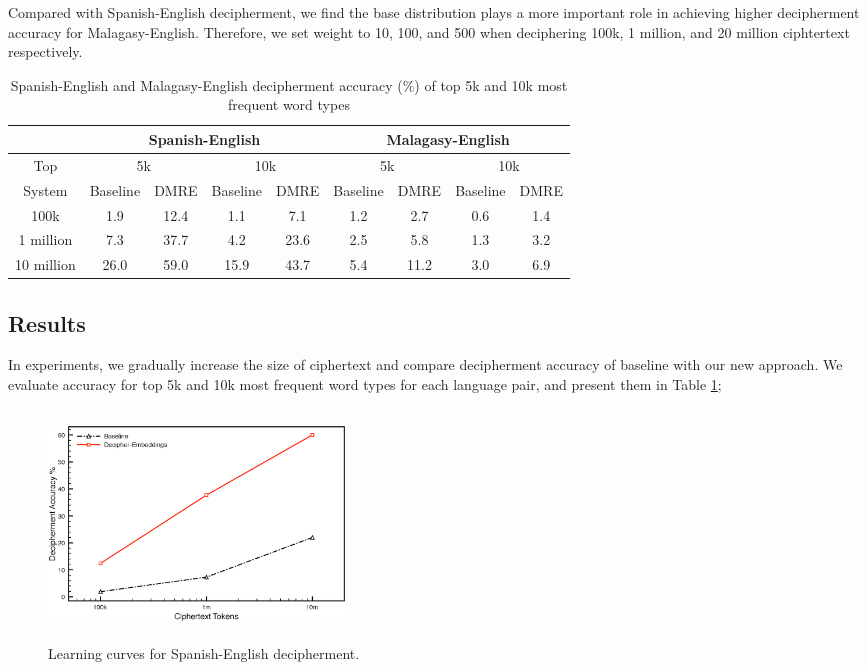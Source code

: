 Compared with Spanish-English decipherment, we find the base distribution plays a more important role in achieving higher decipherment accuracy for Malagasy-English. Therefore, we set weight to 10, 100, and 500 when deciphering 100k, 1 million, and 20 million ciphtertext respectively.


%
 \begin{table}[!ht]
 \begin{center}
 \begin{tabular}{ |c|c|c|c|c|c|c|c|c| } \hline
         & \multicolumn{4}{|c|}{Spanish-English} & \multicolumn{4}{|c|}{Malagasy-English} \\ \hline
 Top &  \multicolumn{2}{|c|}{5k} & \multicolumn{2}{|c|}{10k} & \multicolumn{2}{|c|}{5k} & \multicolumn{2}{|c|}{10k} \\ \hline
 System &  Baseline & DMRE & Baseline & DMRE &  Baseline & DMRE & Baseline & DMRE \\ \hline
 100k &  1.9 & 12.4 & 1.1 & 7.1 &  1.2 & 2.7 & 0.6 & 1.4 \\ \hline
 1 million &  7.3 & 37.7& 4.2 & 23.6 &  2.5 & 5.8 & 1.3 & 3.2 \\ \hline
 10 million &  26.0 & 59.0 & 15.9 & 43.7 &  5.4 & 11.2 & 3.0 & 6.9 \\ \hline
 \end{tabular}
 \caption{Spanish-English and Malagasy-English decipherment accuracy (\%) of top 5k and 10k most frequent word types}
 \label{decipher-acc-result}
 \end{center}
 \end{table}
%

\subsection{Results}
In experiments, we gradually increase the size of ciphertext and compare decipherment accuracy of baseline with our new approach. We evaluate accuracy for top 5k and 10k most frequent word types for each language pair, and present them in Table \ref{decipher-acc-result}; 


 \begin{figure}[!ht]
  \centering
  \includegraphics[width=3.1in,height=2.4in]{es_en_curve}
  \caption{Learning curves for Spanish-English decipherment.}
\label{es-en-curve}
\end{figure}

